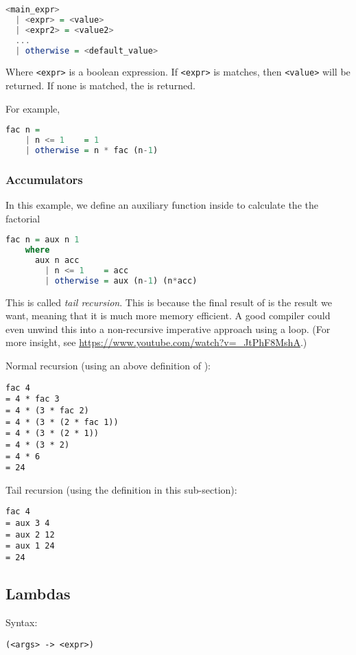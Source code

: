 \begin{lstlisting}[language=haskell]
<main_expr>
  | <expr> = <value>
  | <expr2> = <value2>
  ...
  | otherwise = <default_value>
\end{lstlisting}
Where \texttt{<expr>} is a boolean expression. If \texttt{<expr>} is matches, then \texttt{<value>} will be returned. If none is matched, the \texttt{} is returned.

For example,

\begin{lstlisting}[language=haskell]
  fac n =
    | n <= 1    = 1
    | otherwise = n * fac (n-1)
\end{lstlisting}

\subsubsection{Accumulators}
In this example, we define an auxiliary function \texttt{} inside \texttt{} to calculate the the factorial

\begin{lstlisting}[language=haskell]
  fac n = aux n 1
    where
      aux n acc
        | n <= 1    = acc
        | otherwise = aux (n-1) (n*acc)
\end{lstlisting}

This is called \textit{tail recursion}. This is because the final result of \texttt{} is the result we want, meaning that it is much more memory efficient. A good compiler could even unwind this into a non-recursive imperative approach using a loop. (For more insight, see \url{https://www.youtube.com/watch?v=_JtPhF8MshA}.)

Normal recursion (using an above definition of \texttt{}):
\begin{verbatim}
fac 4
= 4 * fac 3
= 4 * (3 * fac 2)
= 4 * (3 * (2 * fac 1))
= 4 * (3 * (2 * 1))
= 4 * (3 * 2)
= 4 * 6
= 24
\end{verbatim}

Tail recursion (using the definition in this sub-section):
\begin{verbatim}
fac 4
= aux 3 4
= aux 2 12
= aux 1 24
= 24
\end{verbatim}

\subsection{Lambdas}
Syntax:
\begin{center}
  \texttt{(<args> -> <expr>)}
\end{center}

